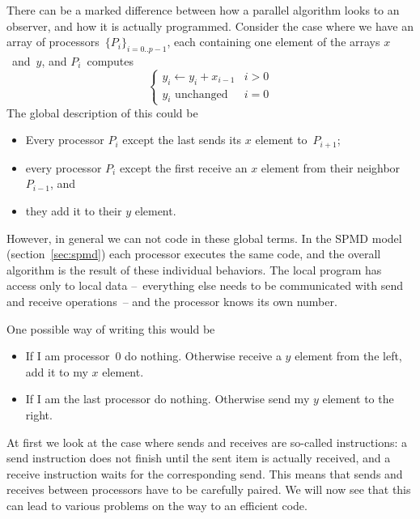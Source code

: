 
There can be a marked difference between how a parallel algorithm looks to an
observer, and how it is actually programmed.
Consider the case where we have an array of processors~$\{P_i\}_{i=0..p-1}$,
each containing one element of the arrays $x$~and~$y$, and
$P_i$~computes
\begin{equation}
\begin{cases}
y_i\leftarrow y_i+x_{i-1}&i>0\\ \mbox{$y_i$ unchanged}&i=0
\end{cases}
\label{eq:mpi-send-left}
\end{equation}
The global description of this could be
\begin{itemize}
\item Every processor $P_i$ except the last sends its $x$ element to~$P_{i+1}$;
\item every processor $P_i$ except the first receive an $x$ element from
  their neighbor~$P_{i-1}$, and
\item they add it to their $y$ element.
\end{itemize}
However, in general we can not code in these global terms.
In the \ac{SPMD} model (section~\ref{sec:spmd}) each
processor executes the same code, and the overall algorithm
is the result of  these individual behaviors. 
The local program has access only to local data --~everything else
needs to be communicated with send and receive operations~-- and the
processor knows its own number.

One possible way of writing this would be
\begin{itemize}
\item If I am processor~0 do nothing. Otherwise receive a $y$ element
  from the left, add it to my $x$ element.
\item If I am the last processor do nothing. Otherwise send my $y$
  element to the right.
\end{itemize}
At first we look at the case where sends and
receives are so-called 
instructions: a send instruction does not finish until the sent item
is actually received, and a receive instruction waits for the
corresponding send. This means that sends and receives between
processors have to be carefully paired. We will now see that this can
lead to various problems on the way to an efficient code.

